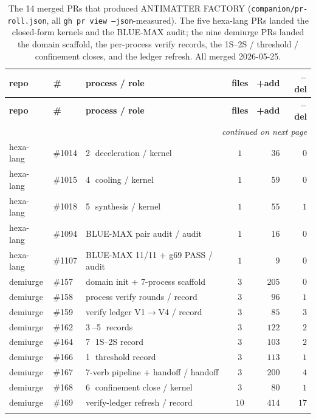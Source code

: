 \begin{center}
\footnotesize
\setlength{\tabcolsep}{4pt}
\begin{longtable}{@{}l l l c r r@{}}
\toprule
\textbf{repo} & \textbf{\#} & \textbf{process / role} & \textbf{files} & \textbf{+add} & \textbf{$-$del} \\
\midrule
\endfirsthead
\toprule
\textbf{repo} & \textbf{\#} & \textbf{process / role} & \textbf{files} & \textbf{+add} & \textbf{$-$del} \\
\midrule
\endhead
\midrule \multicolumn{6}{r}{\footnotesize\itshape continued on next page} \\
\endfoot
\bottomrule
\endlastfoot
hexa-lang & \#1014 & \textcircled{\scriptsize 2} deceleration / kernel & $1$  & $36$  & $0$  \\
hexa-lang & \#1015 & \textcircled{\scriptsize 4} cooling / kernel      & $1$  & $59$  & $0$  \\
hexa-lang & \#1018 & \textcircled{\scriptsize 5} synthesis / kernel    & $1$  & $55$  & $1$  \\
hexa-lang & \#1094 & BLUE-MAX pair audit / audit                       & $1$  & $16$  & $0$  \\
hexa-lang & \#1107 & BLUE-MAX 11/11 + g69 PASS / audit                 & $1$  & $9$   & $0$  \\
\midrule
demiurge  & \#157  & domain init + 7-process scaffold                  & $3$  & $205$ & $0$  \\
demiurge  & \#158  & process verify rounds / record                    & $3$  & $96$  & $1$  \\
demiurge  & \#159  & verify ledger V1$\to$V4 / record                  & $3$  & $85$  & $3$  \\
demiurge  & \#162  & \textcircled{\scriptsize 3}--\textcircled{\scriptsize 5} records & $3$ & $122$ & $2$ \\
demiurge  & \#164  & \textcircled{\scriptsize 7} 1S--2S record          & $3$  & $103$ & $2$  \\
demiurge  & \#166  & \textcircled{\scriptsize 1} threshold record       & $3$  & $113$ & $1$  \\
demiurge  & \#167  & 7-verb pipeline + handoff / handoff                & $3$  & $200$ & $4$  \\
demiurge  & \#168  & \textcircled{\scriptsize 6} confinement close / kernel & $3$ & $80$  & $1$  \\
demiurge  & \#169  & verify-ledger refresh / record                    & $10$ & $414$ & $17$ \\
\caption{The 14 merged PRs that produced ANTIMATTER FACTORY
(\texttt{companion/pr-roll.json}, all \texttt{gh pr view --json}-measured).
The five hexa-lang PRs landed the closed-form kernels and the BLUE-MAX audit;
the nine demiurge PRs landed the domain scaffold, the per-process verify
records, the 1S--2S / threshold / confinement closes, and the ledger refresh.
All merged 2026-05-25.}
\label{tab:pr-roll}
\end{longtable}
\end{center}

